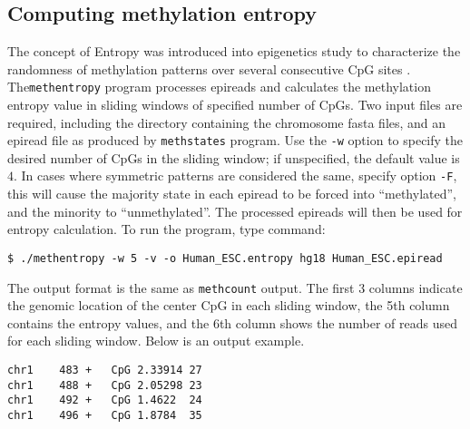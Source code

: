 \documentclass[10pt]{article}
\newcommand{\prog}[1]{\texttt{#1}}
\newcommand{\op}[1]{\texttt{#1}}
\begin{document}







\subsection{Computing methylation entropy}
\label{sec:methentropy}

The concept of Entropy was introduced into epigenetics study to characterize the randomness of methylation patterns over several consecutive CpG sites \cite{xie2011}. The\prog{methentropy} program processes epireads and calculates the methylation entropy value in sliding windows of specified number of CpGs. Two input files are required, including the directory containing the chromosome fasta files, and an epiread file as produced by \prog{methstates} program. Use the \op{-w} option to specify the desired number of CpGs in the sliding window; if unspecified, the default value is $4$. In cases where symmetric patterns are considered the same, specify option \op{-F}, this will cause the majority state in each epiread to be forced into ``methylated'', and the minority to ``unmethylated''. The processed epireads will then be used for entropy calculation. To run the program, type command:
\begin{verbatim}
$ ./methentropy -w 5 -v -o Human_ESC.entropy hg18 Human_ESC.epiread
\end{verbatim} 
The output format is the same as \prog{methcount} output. The first 3 columns indicate the genomic location of the center CpG in each sliding window, the 5th column contains the entropy values, and the 6th column shows the number of reads used for each sliding window. Below is an output example.
\begin{verbatim}
chr1	483	+	CpG	2.33914	27
chr1	488	+	CpG	2.05298	23
chr1	492	+	CpG	1.4622	24
chr1	496	+	CpG	1.8784	35
\end{verbatim}
\end{document}
